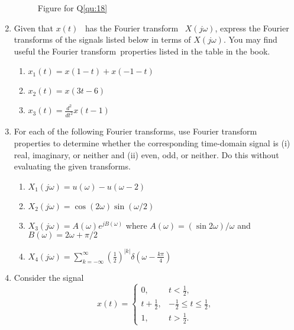 \documentclass[11pt]{article}
\newcommand\ft{Fourier transform}
\newcommand\xt{$x(t)$}
\newcommand\xo{$X(j\omega)$}
\begin{document}
\begin{enumerate}
    \begin{figure}
      \centering
        \begin{subfigure}[t]{0.3\textwidth}
            \centering
            
            \caption{}\label{sfi:q18a}
        \end{subfigure}%
        \hfill
        \begin{subfigure}[t]{0.7\textwidth}
            \centering
            
            \caption{}\label{sfi:q18b}
        \end{subfigure}
      \caption{Figure for Q\ref{qu:18}}\label{fi:q181}
    \end{figure}

    \item Given that \xt~ has the \ft~ \xo, express the \ft s of the signals listed below in terms of \xo. You may find useful the \ft~properties listed in the table in the book.
        \begin{enumerate}
            \item $x_1(t) = x(1-t) + x(-1-t)$
            \item $x_2(t) = x(3t-6) $
            \item $x_3(t) = \frac{d^2}{dt^2}x(t-1) $
        \end{enumerate}
    \item For each of the following \ft s, use \ft~ properties to determine whether the corresponding time-domain signal is (i) real, imaginary, or neither and (ii) even, odd, or neither. Do this without evaluating the given transforms.
        \begin{enumerate}
            \item $X_1(j\omega) = u(\omega) - u(\omega -2)$
            \item $X_2(j\omega) = \cos(2\omega)\sin(\omega/2)$
            \item $X_3(j\omega) = A(\omega)e^{jB(\omega)}$ where $A(\omega) = (\sin 2\omega)/\omega$ and $B(\omega) = 2\omega + \pi/2$
            \item $X_4(j\omega) = \sum_{k=-\infty}^{\infty}\left(\frac{1}{2}\right)^{|k|}\delta\left(\omega - \frac{k\pi}{4}\right)$
        \end{enumerate}
    \item Consider the signal
        \begin{equation*}
            x(t) = \begin{cases} 0, & t < \frac{1}{2},\\ t + \frac{1}{2}, & -\frac{1}{2} \leq t \leq \frac{1}{2},\\1, & t>\frac{1}{2}.

\end{cases}
\end{equation*}
\end{enumerate}
\end{document}
